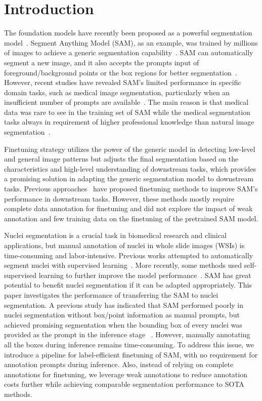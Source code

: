 \documentclass[conference]{IEEEtran}
\begin{document}
\section{Introduction}
The foundation models have recently been proposed as a powerful segmentation model~\cite{brown2020language,openai2023gpt4}. Segment Anything Model (SAM), as an example, was trained by millions of images to achieve a generic segmentation capability~\cite{kirillov2023segment}. SAM can automatically segment a new image, and it also accepts the prompts input of foreground/background points or the box regions for better segmentation~\cite{deng2023segment,ma2023segment,wu2023medical,zhang2023input}. However, recent studies have revealed SAM's limited performance in specific domain tasks, such as medical image segmentation, particularly when an insufficient number of prompts are available~\cite{deng2023segment}. The main reason is that medical data was rare to see in the training set of SAM while the medical segmentation tasks always in requirement of higher professional knowledge than natural image segmentation~\cite{huo2021ai}. 

Finetuning strategy utilizes the power of the generic model in detecting low-level and general image patterns but adjusts the final segmentation based on the characteristics and high-level understanding of downstream tasks, which provides a promising solution in adapting the generic segmentation model to downstream tasks. Previous approaches~\cite{wu2023medical, chen2023sam} have proposed finetuning methods to improve SAM's performance in downstream tasks. However, these methods mostly require complete data annotation for finetuning and did not explore the impact of weak annotation and few training data on the finetuning of the pretrained SAM model. 

Nuclei segmentation is a crucial task in biomedical research and clinical applications, but manual annotation of nuclei in whole slide images (WSIs) is time-consuming and labor-intensive. Previous works attempted to automatically segment nuclei with supervised learning~\cite{kong2020nuclear, hu2019mc}. More recently, some methods used self-supervised learning to further improve the model performance~\cite{xie2020instance, sahasrabudhe2020self}. SAM has great potential to benefit nuclei segmentation if it can be adapted appropriately. This paper investigates the performance of transferring the SAM to nuclei segmentation. A previous study has indicated that SAM performed poorly in nuclei segmentation without box/point information as manual prompts, but achieved promising segmentation when the bounding box of every nuclei was provided as the prompt in the inference stage ~\cite{deng2023segment}. However, manually annotating all the boxes during inference remains time-consuming. To address this issue, we introduce a pipeline for label-efficient finetuning of SAM, with no requirement for annotation prompts during inference. Also, instead of relying on complete annotations for finetuning, we leverage weak annotations to reduce annotation costs further while achieving comparable segmentation performance to SOTA methods. 
\end{document}
